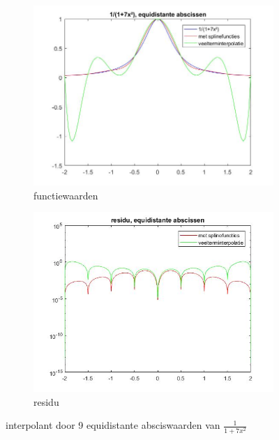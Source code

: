 \begin{figure}[H]
\centering
\begin{subfigure}{.5\textwidth}
  \centering
  \includegraphics[width=\linewidth]{afbeeldingen/rat_equi.jpg}
  \caption{functiewaarden}
\end{subfigure}%
\begin{subfigure}{.5\textwidth}
  \centering
  \includegraphics[width=\linewidth]{afbeeldingen/rat_equi_res.jpg}
  \caption{residu}
\end{subfigure}
\caption{interpolant door 9 equidistante absciswaarden van $\frac{1}{1+7x^2}$}
\label{fig:ratequi}
\end{figure}